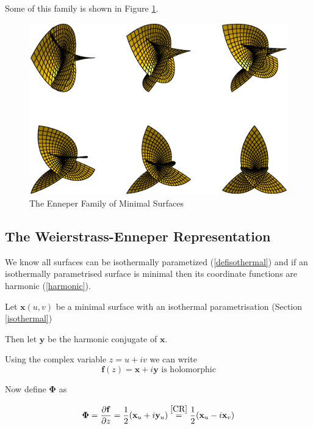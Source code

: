 \begin{example}
Some of this family is shown in Figure \ref{fig:enneper}.

\begin{figure}[htbp]
	\centering
       \includegraphics[width=12cm]{Images/EnneperFamily.eps}
   \caption{The Enneper Family of Minimal Surfaces}
   \label{fig:enneper}
\end{figure}

\end{example} 

\subsection{The Weierstrass-Enneper Representation}
\label{WERep}
We know all surfaces can be isothermally parametized (\ref{defisothermal}) and if an isothermally parametrised surface is minimal then its coordinate functions are harmonic (\ref{harmonic}).

Let $\mathbf x(u,v)$ be a minimal surface with an isothermal parametrisation (Section \ref{isothermal})

Then let $\mathbf y$ be the harmonic conjugate of $\mathbf x$.

Using the complex variable $z = u + iv$ we can write
\begin{displaymath}
\mathbf f(z) = \mathbf x + i \mathbf y \mbox{\ \ is holomorphic}
\end{displaymath}

Now define $\mathbf \Phi$ as

\begin{displaymath}
\mathbf \Phi = \frac{\partial \mathbf f}{\partial z} = \frac{1}{2}(\mathbf x_u + i \mathbf y_u) \stackrel{\ref{CR}}{=} \frac{1}{2}(\mathbf x_u - i \mathbf x_v) 
\label{Phi}
\end{displaymath}

